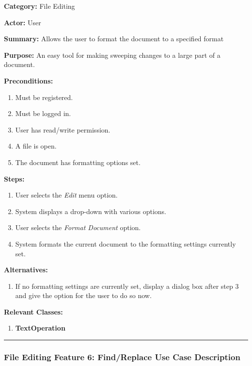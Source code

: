 \documentclass[twoside,letterpaper]{article}
\begin{document}
		\noindent\textbf{Category:} File Editing \newline
		
		\noindent\textbf{Actor:} User \newline
		
		\noindent\textbf{Summary:} Allows the user to format the document to a specified format \newline
		
		\noindent\textbf{Purpose:} An easy tool for making sweeping changes to a large part of a document. \newline
		
		\noindent\textbf{Preconditions:}
		\begin{enumerate}
			\item Must be registered.
			\item Must be logged in.
			\item User has read/write permission.
			\item A file is open.
			\item The document has formatting options set.
		\end{enumerate}
		\noindent\textbf{Steps:}
		\begin{enumerate}
			\item User selects the \textit{Edit} menu option.
			\item System displays a drop-down with various options.
			\item User selects the \textit{Format Document} option.
			\item System formats the current document to the formatting settings currently set.
		\end{enumerate}
		\noindent\textbf{Alternatives:}
		\begin{enumerate}
			\item If no formatting settings are currently set, display a dialog box after step 3 and give the option for the user to do so now.
		\end{enumerate}
		\noindent\textbf{Relevant Classes:}
		\begin{enumerate}
			\item \textbf{TextOperation}
		\end{enumerate}
	\vspace{8pt}
	\hrule
	\newpage
	
	\subsubsection[File Editing Feature 6: Find/Replace]{\rmfamily\bfseries\color{black}
		File Editing Feature 6: Find/Replace Use Case Description}
	\hypertarget{RefHeading22059017292}{}
	
\end{document}
